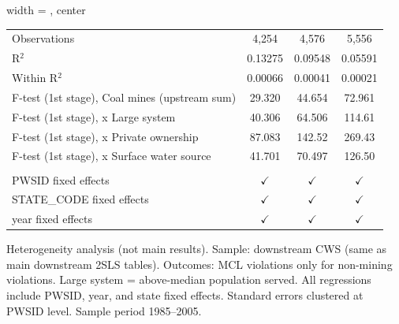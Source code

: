 \begin{table}[htbp]
\begin{adjustbox}{width = \textwidth, center}
\begin{tabular}{lccc}
          \\
         
         Observations                                  & 4,254                & 4,576         & 5,556\\  
         R$^2$                                         & 0.13275              & 0.09548       & 0.05591\\  
         Within R$^2$                                  & 0.00066              & 0.00041       & 0.00021\\  
         F-test (1st stage), Coal mines (upstream sum) & 29.320               & 44.654        & 72.961\\  
         F-test (1st stage),   x Large system          & 40.306               & 64.506        & 114.61\\  
         F-test (1st stage),   x Private ownership     & 87.083               & 142.52        & 269.43\\  
         F-test (1st stage),   x Surface water source  & 41.701               & 70.497        & 126.50\\  
         
          \\
         
         PWSID fixed effects                           & $\checkmark$         & $\checkmark$  & $\checkmark$\\   
         STATE\_CODE fixed effects                     & $\checkmark$         & $\checkmark$  & $\checkmark$\\   
         year fixed effects                            & $\checkmark$         & $\checkmark$  & $\checkmark$\\   
         
         \bottomrule
         
      \end{tabular}
      
      
      
   \end{adjustbox}
      {\tiny\linespread{1}\selectfont \par \raggedright 
   Heterogeneity analysis (not main results). Sample: downstream CWS (same as main downstream 2SLS tables). Outcomes: MCL violations only for non-mining violations. Large system = above-median population served. All regressions include PWSID, year, and state fixed effects. Standard errors clustered at PWSID level. Sample period 1985--2005.}
   
\end{table}


